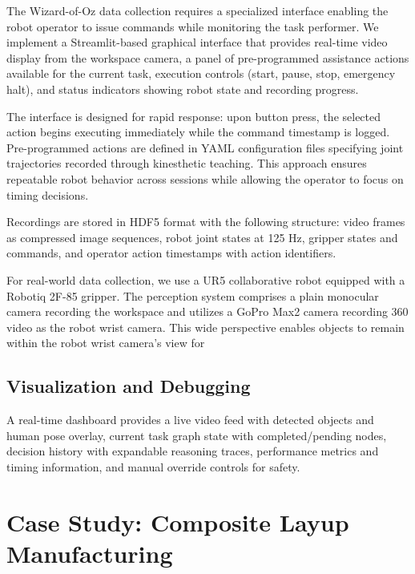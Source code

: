 \documentclass[11pt, a4paper]{article}
\begin{document}
The Wizard-of-Oz data collection requires a specialized interface enabling the robot operator to issue commands while monitoring the task performer. We implement a Streamlit-based graphical interface that provides real-time video display from the workspace camera, a panel of pre-programmed assistance actions available for the current task, execution controls (start, pause, stop, emergency halt), and status indicators showing robot state and recording progress.

The interface is designed for rapid response: upon button press, the selected action begins executing immediately while the command timestamp is logged. Pre-programmed actions are defined in YAML configuration files specifying joint trajectories recorded through kinesthetic teaching. This approach ensures repeatable robot behavior across sessions while allowing the operator to focus on timing decisions.

Recordings are stored in HDF5 format with the following structure: video frames as compressed image sequences, robot joint states at 125 Hz, gripper states and commands, and operator action timestamps with action identifiers.

For real-world data collection, we use a UR5 collaborative robot equipped with a Robotiq 2F-85 gripper. The perception system comprises a plain monocular camera recording the workspace and utilizes a GoPro Max2 camera recording 360 video as the robot wrist camera. This wide perspective enables objects to remain within the robot wrist camera's view for 

\subsection{Visualization and Debugging}

A real-time dashboard provides a live video feed with detected objects and human pose overlay, current task graph state with completed/pending nodes, decision history with expandable reasoning traces, performance metrics and timing information, and manual override controls for safety.

\section{Case Study: Composite Layup Manufacturing}
\end{document}
